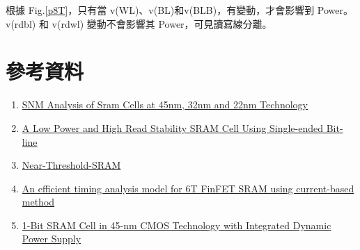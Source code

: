 \documentclass{article}
\begin{document}
根據 Fig.\ref{p8T}，只有當 v(WL)、v(BL)和v(BLB)，有變動，才會影響到 Power。v(rdbl) 和 v(rdwl) 變動不會影響其 Power，可見讀寫線分離。
   

\section{參考資料}

\begin{enumerate}

\item\href{https://citeseerx.ist.psu.edu/viewdoc/download;jsessionid=151FCDB529E9C1DDACEFF440EBB2194A?doi=10.1.1.679.5935&rep=rep1&type=pdf}{SNM Analysis of Sram Cells at 45nm, 32nm and 22nm Technology}

\item\href{http://163.17.20.49/AIT2011/2011AIT%E8%AB%96%E6%96%87%E5%85%A8%E6%96%87/ft_145.pdf}{A Low Power and High Read Stability SRAM
Cell Using Single-ended Bit-line }

\item\href{https://github.com/Hassan313/Near-Threshold-SRAM/blob/master/SRAM%20Cells%20Netlist/8T_SRAM_Cell.sp}{Near-Threshold-SRAM}

\item\href{https://www.researchgate.net/publication/303563712_An_efficient_timing_analysis_model_for_6T_FinFET_SRAM_using_current-based_method}{An efficient timing analysis model for 6T FinFET SRAM using current-based method}

\item\href{https://zheliu0.com/post/sram/}{1-Bit SRAM Cell in 45-nm CMOS Technology with Integrated Dynamic Power Supply}
 
\end{enumerate}
\end{document}
